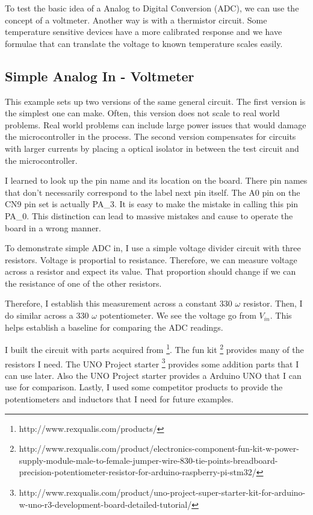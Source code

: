 \documentclass{article}
\begin{document}
To test the basic idea of a Analog to Digital Conversion (ADC), we can use the concept of a voltmeter.  Another way is with a thermistor circuit.  Some temperature sensitive devices have a more calibrated response and we have formulae that can translate the voltage to known temperature scales easily.   

\subsection{Simple Analog In - Voltmeter} %
\label{sub:simple_analog_in_voltmeter}

This example sets up two versions of the same general circuit.  The first version is the simplest one can make.  Often, this version does not scale to real world problems.  Real world problems can include large power issues that would damage the microcontroller in the process.  The second version compensates for circuits with larger currents by placing a optical isolator in between the test circuit and the microcontroller.  



I learned to look up the pin name and its location on the board.   There pin names that don't necessarily correspond to the label next pin itself.  The A0 pin on the CN9 pin set is actually PA\_3.  It is easy to make the mistake in calling this pin PA\_0.   This distinction can lead to massive mistakes and cause to operate the board in a wrong manner.  

To demonstrate simple ADC in, I use a simple voltage divider circuit with three resistors.  Voltage is proportial to resistance.  Therefore, we can measure voltage across a resistor and expect its value.  That proportion should change if we can the resistance of one of the other resistors.  

Therefore, I establish this measurement across a constant 330 $\omega$ resistor.  Then, I do similar across a 330 $\omega$ potentiometer.  We see the voltage go from $V_{in}$.  This helps establish a baseline for comparing the ADC readings.   

I built the circuit with parts acquired from \footnote{http://www.rexqualis.com/products/}.  The fun kit \footnote{http://www.rexqualis.com/product/electronics-component-fun-kit-w-power-supply-module-male-to-female-jumper-wire-830-tie-points-breadboard-precision-potentiometer-resistor-for-arduino-raspberry-pi-stm32/} 
provides many of the resistors I need.   The UNO Project starter \footnote{http://www.rexqualis.com/product/uno-project-super-starter-kit-for-arduino-w-uno-r3-development-board-detailed-tutorial/} provides some addition parts that I can use later.  Also the UNO Project starter provides a Arduino UNO that I can use for comparison.  Lastly, I used some competitor products to provide the potentiometers and inductors that I need for future examples.  
\end{document}
